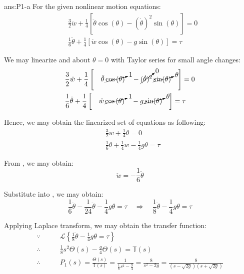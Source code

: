 \documentclass{tron}
\begin{document}
\begin{answer}{ans:P1-a}
	For the given nonlinear motion equations:
	\begin{align}
		& \frac32 \ddot{w} + \frac14 \left[ \ddot{\theta} \cos{(\theta)} - (\dot{\theta})^2 \sin(\theta) \right] = 0 \label{eqn:a:1} \\
		& \frac16 \ddot{\theta} + \frac14 \left[ \ddot{w} \cos{(\theta)} - g \sin(\theta) \right] = \tau \label{eqn:a:2}
	\end{align}
	
	We may linearize  and  about $\theta = 0$ with Taylor series for small angle changes:
	\begin{align}
		& \frac32 \ddot{w} + \frac14 \left[ \quad \ddot{\theta} \, \cancelto{1}{\cos{(\theta)}} \quad  - \cancelto{0}{(\dot{\theta})^2} \, \cancelto{\theta}{\sin(\theta)} \quad \right] = 0  \\
		& \frac16 \ddot{\theta} + \frac14 \left[ \quad  \ddot{w} \, \cancelto{1}{\cos{(\theta)}} \quad  - g \, \cancelto{\theta}{\sin(\theta)} \quad \right] = \tau 
	\end{align}
	
	Hence, we may obtain the linearized set of equations as following:
	\begin{align}
		& \frac32 \ddot{w} + \frac14 \ddot{\theta} = 0 \label{eqn:a:1:linear} \\
		& \frac16 \ddot{\theta} + \frac14 \ddot{w} - \frac14 g \theta = \tau \label{eqn:a:2:linear}
	\end{align}
	
	From , we may obtain:
	\begin{equation}
		\ddot{w} = -\frac16 \ddot{\theta} \label{eqn:a:w-theta}
	\end{equation}
	
	Substitute  into , we may obtain:
	\begin{equation}
		\frac16 \ddot{\theta} - \frac1{24} \ddot{\theta} - \frac14 g \theta = \tau \quad \Rightarrow \quad \frac18 \ddot{\theta}- \frac14 g \theta = \tau
	\end{equation}
	
	Applying Laplace transform, we may obtain the transfer function:
	\begin{align}
		\because \qquad 		& \mathcal{L}\left\{ \frac18 \ddot{\theta}- \frac14 g \theta = \tau \right\} \\
		\therefore \qquad 	& \frac18 s^2 \Theta(s) - \frac{g}4 \Theta(s) = \mathbb{T}(s)  \\
		\therefore \qquad 	& P_1 (s) = \frac{\Theta(s)}{\mathbb{T}(s)} = \frac{1}{\frac18 s^2  - \frac{g}4} = \frac{8}{s^2 - 2 g} = \frac{8}{(s - \sqrt{2g})(s + \sqrt{2g})}
	\end{align}
	

\end{answer}
\end{document}
